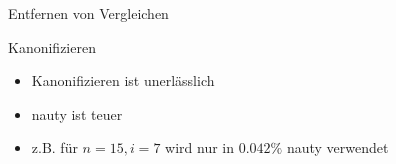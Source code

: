 \begin{frame}{Entfernen von Vergleichen}
  \centering
  
\end{frame}

\begin{frame}{Kanonifizieren}
  \begin{itemize}
    \item<+-> Kanonifizieren ist unerlässlich
    \item<+-> nauty ist teuer
    \item<+-> z.B. für $n=15,i=7$ wird nur in $0.042\%$ nauty verwendet
  \end{itemize}
\end{frame}


